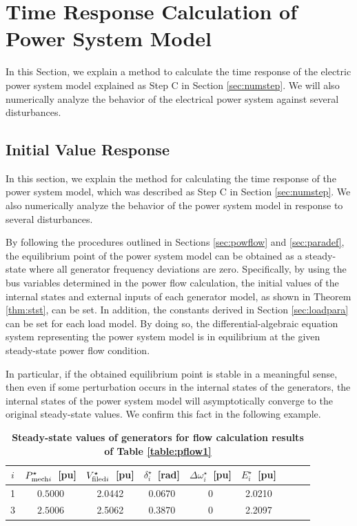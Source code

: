 \documentclass[graybox, envcountchap]{svmult}
\begin{document}
\section{Time Response Calculation of Power System Model}\label{sec:numsimtr}

In this Section, we explain a method to calculate the time response of the
electric power system model explained as Step C in Section \ref{sec:numstep}.
We will also numerically analyze the behavior of the electrical power system
against several disturbances.

\subsection{Initial Value Response}

In this section, we explain the method for calculating the time response of the
power system model, which was described as Step C in Section \ref{sec:numstep}.
We also numerically analyze the behavior of the power system model in response
to several disturbances.

By following the procedures outlined in Sections \ref{sec:powflow} and
\ref{sec:paradef}, the equilibrium point of the power system model can be
obtained as a steady-state where all generator frequency deviations are zero.
Specifically, by using the bus variables determined in the power flow
calculation, the initial values of the internal states and external inputs of
each generator model, as shown in Theorem \ref{thm:stst}, can be set. In
addition, the constants derived in Section \ref{sec:loadpara} can be set for
each load model. By doing so, the differential-algebraic equation system
representing the power system model is in equilibrium at the given steady-state
power flow condition.

In particular, if the obtained equilibrium point is stable in a meaningful
sense, then even if some perturbation occurs in the internal states of the
generators, the internal states of the power system model will asymptotically
converge to the original steady-state values. We confirm this fact in the
following example.

\begin{table}[ht]
\medskip
 \caption{\textbf{Steady-state values of generators for flow calculation results of Table \ref{table:pflow1}}}
 \label{table:genst13a}
 \centering
  \begin{tabular}{ccccccccc}
   \hline
$i$ &  $P_{{\rm mech}i}^{\star}$~[pu] & $V_{{\rm filed}i}^{\star}$~[pu] & $\delta_i^{\star}$~[rad] & $\Delta \omega_i^{\star}$~[pu] & $E_i^{\star}$~[pu] \\
   \hline \hline
1 & $0.5000$ & 2.0442 & 0.0670 & 0 & 2.0210 \\
3 & $2.5006$ & 2.5062 & 0.3870 & 0 & 2.2097 \\
   \hline
  \end{tabular}
\end{table}
\end{document}
